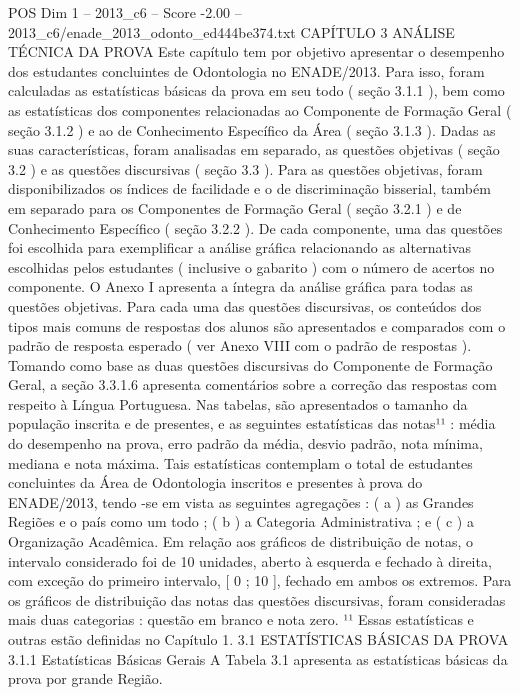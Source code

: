 \begin{textsample}{POS Dim 1 – 2013\_c6 – Score -2.00 – 2013\_c6/enade\_2013\_odonto\_ed444be374.txt}  \label{ex:f1_pos_179}
CAPÍTULO 3 ANÁLISE TÉCNICA DA PROVA Este capítulo tem por objetivo apresentar o desempenho dos estudantes concluintes de Odontologia no ENADE/2013.
Para isso, foram calculadas as estatísticas básicas da prova em seu todo ( seção 3.1.1 ), bem como as estatísticas dos componentes relacionadas ao Componente de Formação Geral ( seção 3.1.2 ) e ao de Conhecimento Específico da Área ( seção 3.1.3 ).
Dadas as suas características, foram analisadas em separado, as questões objetivas ( seção 3.2 ) e as questões discursivas ( seção 3.3 ).
Para as questões objetivas, foram disponibilizados os índices de facilidade e o de discriminação bisserial, também em separado para os Componentes de Formação Geral ( seção 3.2.1 ) e de Conhecimento Específico ( seção 3.2.2 ).
De cada componente, uma das questões foi escolhida para exemplificar a análise gráfica relacionando as alternativas escolhidas pelos estudantes ( inclusive o gabarito ) com o número de acertos no componente.
O Anexo I apresenta a íntegra da análise gráfica para todas as questões objetivas.
Para cada uma das questões discursivas, os conteúdos dos tipos mais comuns de respostas dos alunos são apresentados e comparados com o padrão de resposta esperado ( ver Anexo VIII com o padrão de respostas ).
Tomando como base as duas questões discursivas do Componente de Formação Geral, a seção 3.3.1.6 apresenta comentários sobre a correção das respostas com respeito à Língua Portuguesa.
Nas tabelas, são apresentados o tamanho da população inscrita e de presentes, e as seguintes estatísticas das notas¹¹ : média do desempenho na prova, erro padrão da média, desvio padrão, nota mínima, mediana e nota máxima.
Tais estatísticas contemplam o total de estudantes concluintes da Área de Odontologia inscritos e presentes à prova do ENADE/2013, tendo -se em vista as seguintes agregações : ( a ) as Grandes Regiões e o país como um todo ; ( b ) a Categoria Administrativa ; e ( c ) a Organização Acadêmica.
Em relação aos gráficos de distribuição de notas, o intervalo considerado foi de 10 unidades, aberto à esquerda e fechado à direita, com exceção do primeiro intervalo, [ 0 ; 10 ], fechado em ambos os extremos.
Para os gráficos de distribuição das notas das questões discursivas, foram consideradas mais duas categorias : questão em branco e nota zero. ¹¹ Essas estatísticas e outras estão definidas no Capítulo 1. 3.1 ESTATÍSTICAS BÁSICAS DA PROVA 3.1.1 Estatísticas Básicas Gerais A Tabela 3.1 apresenta as estatísticas básicas da prova por grande Região.

\end{textsample}

